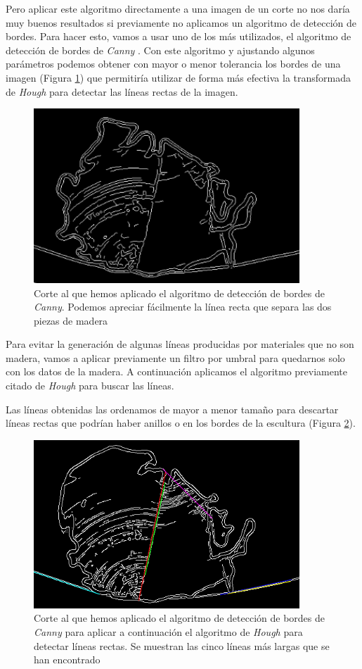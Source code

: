 Pero aplicar este algoritmo directamente a una imagen de un corte no nos daría muy buenos resultados si previamente no aplicamos un algoritmo de detección de bordes. Para hacer esto, vamos a usar uno de los más utilizados, el algoritmo de detección de bordes de \textit{Canny} \cite{canny86}. Con este algoritmo y ajustando algunos parámetros podemos obtener con mayor o menor tolerancia los bordes de una imagen (Figura \ref{fig:desarrollo/canny}) que permitiría utilizar de forma más efectiva la transformada de \textit{Hough} para detectar las líneas rectas de la imagen.

\begin{figure}[H]
	\centering
	\includegraphics[width=10cm]{imagenes/desarrollo/canny}
	\caption{Corte al que hemos aplicado el algoritmo de detección de bordes de \textit{Canny}. Podemos apreciar fácilmente la línea recta que separa las dos piezas de madera}
	\label{fig:desarrollo/canny}
\end{figure}

Para evitar la generación de algunas líneas producidas por materiales que no son madera, vamos a aplicar previamente un filtro por umbral para quedarnos solo con los datos de la madera. A continuación aplicamos el algoritmo previamente citado de \textit{Hough} para buscar las líneas. 

Las líneas obtenidas las ordenamos de mayor a menor tamaño para descartar líneas rectas que podrían haber anillos o en los bordes de la escultura (Figura \ref{fig:desarrollo/canny-hough}).

\begin{figure}[H]
	\centering
	\includegraphics[width=10cm]{imagenes/desarrollo/canny-hough}
	\caption{Corte al que hemos aplicado el algoritmo de detección de bordes de \textit{Canny} para aplicar a continuación el algoritmo de \textit{Hough} para detectar líneas rectas. Se muestran las cinco líneas más largas que se han encontrado}
	\label{fig:desarrollo/canny-hough}
\end{figure}

